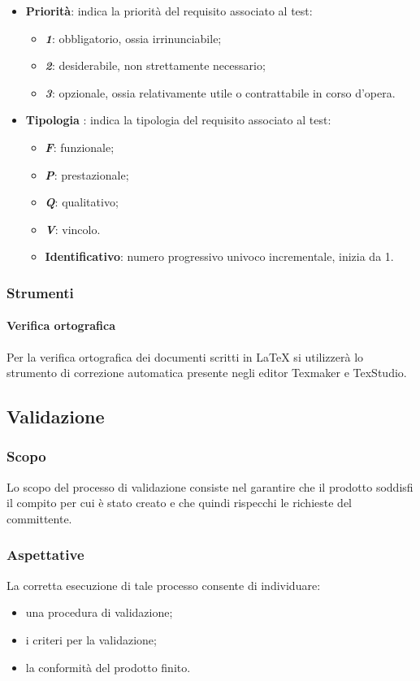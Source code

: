 			\begin{itemize}
				\item \textbf{Priorità}: indica la priorità del requisito associato al test:
				\begin{itemize}
					\item \textbf{\textit{1}}: obbligatorio, ossia irrinunciabile;
					\item \textbf{\textit{2}}: desiderabile, non strettamente necessario;
					\item \textbf{\textit{3}}: opzionale, ossia relativamente utile o contrattabile in corso d'opera.
				\end{itemize}
				\item \textbf{Tipologia} : indica la tipologia del requisito associato al test:
				\begin{itemize}
					\item \textbf{\textit{F}}: funzionale;
					\item \textbf{\textit{P}}: prestazionale;
					\item \textbf{\textit{Q}}: qualitativo;
					\item \textbf{\textit{V}}: vincolo.
					\item \textbf{Identificativo}: numero progressivo univoco incrementale, inizia da 1.
				\end{itemize}
			\end{itemize}
			\subsubsection{Strumenti}
			\paragraph{Verifica ortografica}
			Per la verifica ortografica dei documenti scritti in \LaTeX{} si utilizzerà lo strumento di correzione automatica presente negli editor Texmaker e TexStudio.

	\subsection{Validazione}
		\subsubsection{Scopo}
			Lo scopo del processo di validazione consiste nel garantire che il prodotto soddisfi il compito per cui è stato creato e che quindi rispecchi le richieste del committente.
		\subsubsection{Aspettative}
			La corretta esecuzione di tale processo consente di individuare:
			\begin{itemize}
				\item una procedura di validazione;
				\item i criteri per la validazione;
				\item la conformità del prodotto finito.
			\end{itemize}
